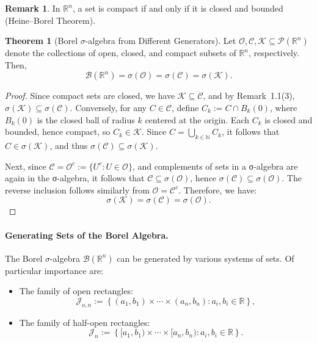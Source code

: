 \documentclass{article}
\theoremstyle{definition}
\newtheorem{theorem}{Theorem}[section]
\newtheorem{remark}{Remark}[section]
\begin{document}
\medskip
\begin{remark}
In \( \mathbb{R}^n \), a set is compact if and only if it is closed and bounded (Heine–Borel Theorem).
\end{remark}

\medskip
\begin{theorem}[Borel $\sigma$-algebra from Different Generators]\label{thm:borel-generators}
Let \( \mathcal{O}, \mathcal{C}, \mathcal{K} \subseteq \mathcal{P}(\mathbb{R}^n) \) denote the collections of open, closed, and compact subsets of \( \mathbb{R}^n \), respectively. Then,
\[
\mathcal{B}(\mathbb{R}^n) = \sigma(\mathcal{O}) = \sigma(\mathcal{C}) = \sigma(\mathcal{K}).
\]
\end{theorem}

\begin{proof}
Since compact sets are closed, we have \( \mathcal{K} \subseteq \mathcal{C} \), and by Remark~1.1(3), \( \sigma(\mathcal{K}) \subseteq \sigma(\mathcal{C}) \). Conversely, for any \( C \in \mathcal{C} \), define \( C_k := C \cap B_k(0) \), where \( B_k(0) \) is the closed ball of radius \( k \) centered at the origin. Each \( C_k \) is closed and bounded, hence compact, so \( C_k \in \mathcal{K} \). Since \( C = \bigcup_{k \in \mathbb{N}} C_k \), it follows that \( C \in \sigma(\mathcal{K}) \), and thus \( \sigma(\mathcal{C}) \subseteq \sigma(\mathcal{K}) \).

Next, since \( \mathcal{C} = \mathcal{O}^c := \{ U^c : U \in \mathcal{O} \} \), and complements of sets in a σ-algebra are again in the σ-algebra, it follows that \( \mathcal{C} \subseteq \sigma(\mathcal{O}) \), hence \( \sigma(\mathcal{C}) \subseteq \sigma(\mathcal{O}) \). The reverse inclusion follows similarly from \( \mathcal{O} = \mathcal{C}^c \). Therefore, we have:
\[
\sigma(\mathcal{K}) = \sigma(\mathcal{C}) = \sigma(\mathcal{O}).
\]
\end{proof}

\paragraph{Generating Sets of the Borel Algebra.}
The Borel $\sigma$-algebra $\mathcal{B}(\mathbb{R}^n)$ can be generated by various systems of sets. Of particular importance are:

\begin{itemize}
    \item The family of open rectangles:
    \[
    \mathcal{J}_{o,n} := \left\{ (a_1, b_1) \times \cdots \times (a_n, b_n) : a_i, b_i \in \mathbb{R} \right\},
    \]
    \item The family of half-open rectangles:
    \[
    \mathcal{J}_n := \left\{ [a_1, b_1) \times \cdots \times [a_n, b_n) : a_i, b_i \in \mathbb{R} \right\}.
    \]
\end{itemize}
\end{document}
